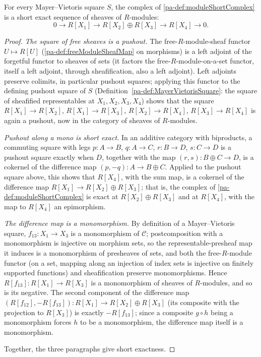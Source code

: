 \begin{theorem}
  \label{pa-thm:moduleShortComplex_shortExact}
  \leanok

  For every Mayer--Vietoris square \(S\), the complex of \ref{pa-def:moduleShortComplex} is a
  short exact sequence of sheaves of \(R\)-modules:
  \[
    0 \to R[X_1] \to R[X_2] \oplus R[X_3] \to R[X_4] \to 0 .
  \]
\end{theorem}
\begin{proof}
  \leanok
  \emph{The square of free sheaves is a pushout.} The free-\(R\)-module-sheaf functor
  \(U \mapsto R[U]\) (\ref{pa-def:freeModuleSheafMap} on morphisms) is a left adjoint of the
  forgetful functor to sheaves of sets (it factors the free-\(R\)-module-on-a-set functor,
  itself a left adjoint, through sheafification, also a left adjoint). Left adjoints
  preserve colimits, in particular pushout squares; applying this functor to the defining
  pushout square of \(S\) (Definition~\ref{pa-def:MayerVietorisSquare}: the square of
  sheafified representables at \(X_1,X_2,X_3,X_4\)) shows that the square
  \(R[X_1] \to R[X_2]\), \(R[X_1] \to R[X_3]\), \(R[X_2] \to R[X_4]\),
  \(R[X_3] \to R[X_4]\) is again a pushout, now in the category of sheaves of
  \(R\)-modules.

  \emph{Pushout along a mono is short exact.} In an additive category with biproducts, a
  commuting square with legs \(p : A \to B\), \(q : A \to C\), \(r : B \to D\),
  \(s : C \to D\) is a pushout square exactly when \(D\), together with the map
  \((r,s) : B \oplus C \to D\), is a cokernel of the difference map
  \((p,-q) : A \to B \oplus C\). Applied to the pushout square above, this shows that
  \(R[X_4]\), with the sum map, is a cokernel of the difference map
  \(R[X_1] \to R[X_2] \oplus R[X_3]\); that is, the complex of \ref{pa-def:moduleShortComplex}
  is exact at \(R[X_2] \oplus R[X_3]\) and at \(R[X_4]\), with the map to \(R[X_4]\) an
  epimorphism.

  \emph{The difference map is a monomorphism.} By definition of a Mayer--Vietoris square,
  \(f_{13} : X_1 \to X_3\) is a monomorphism of \(\mathcal C\); postcomposition with a
  monomorphism is injective on morphism sets, so the representable-presheaf map it induces
  is a monomorphism of presheaves of sets, and both the free-\(R\)-module functor (on a set,
  mapping along an injection of index sets is injective on finitely supported functions) and
  sheafification preserve monomorphisms. Hence \(R[f_{13}] : R[X_1] \to R[X_3]\) is a
  monomorphism of sheaves of \(R\)-modules, and so is its negative. The second component of
  the difference map \((R[f_{12}], -R[f_{13}]) : R[X_1] \to R[X_2] \oplus R[X_3]\) (its
  composite with the projection to \(R[X_3]\)) is exactly \(-R[f_{13}]\); since a composite
  \(g \circ h\) being a monomorphism forces \(h\) to be a monomorphism, the difference map
  itself is a monomorphism.

  Together, the three paragraphs give short exactness.
\end{proof}

